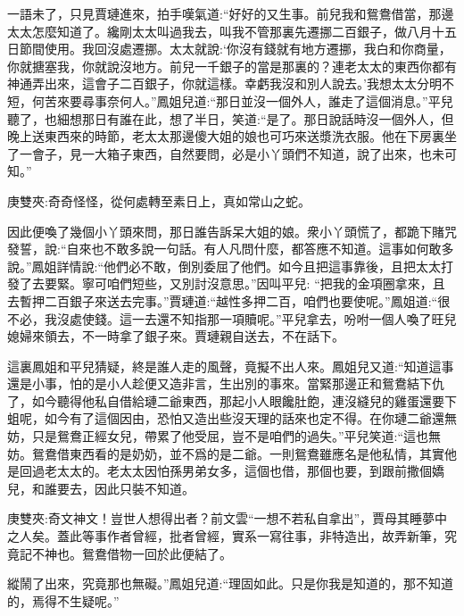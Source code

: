 \begin{parag}
    一語未了，只見賈璉進來，拍手嘆氣道:“好好的又生事。前兒我和鴛鴦借當，那邊太太怎麼知道了。纔剛太太叫過我去，叫我不管那裏先遷挪二百銀子，做八月十五日節間使用。我回沒處遷挪。太太就說:‘你沒有錢就有地方遷挪，我白和你商量，你就搪塞我，你就說沒地方。前兒一千銀子的當是那裏的？連老太太的東西你都有神通弄出來，這會子二百銀子，你就這樣。幸虧我沒和別人說去。’我想太太分明不短，何苦來要尋事奈何人。”鳳姐兒道:“那日並沒一個外人，誰走了這個消息。”平兒聽了，也細想那日有誰在此，想了半日，笑道:“是了。那日說話時沒一個外人，但晚上送東西來的時節，老太太那邊傻大姐的娘也可巧來送漿洗衣服。他在下房裏坐了一會子，見一大箱子東西，自然要問，必是小丫頭們不知道，說了出來，也未可知。”\begin{note}庚雙夾:奇奇怪怪，從何處轉至素日上，真如常山之蛇。\end{note}因此便喚了幾個小丫頭來問，那日誰告訴呆大姐的娘。衆小丫頭慌了，都跪下賭咒發誓，說:“自來也不敢多說一句話。有人凡問什麼，都答應不知道。這事如何敢多說。”鳳姐詳情說:“他們必不敢，倒別委屈了他們。如今且把這事靠後，且把太太打發了去要緊。寧可咱們短些，又別討沒意思。”因叫平兒: “把我的金項圈拿來，且去暫押二百銀子來送去完事。”賈璉道:“越性多押二百，咱們也要使呢。”鳳姐道:“很不必，我沒處使錢。這一去還不知指那一項贖呢。”平兒拿去，吩咐一個人喚了旺兒媳婦來領去，不一時拿了銀子來。賈璉親自送去，不在話下。
\end{parag}


\begin{parag}
    這裏鳳姐和平兒猜疑，終是誰人走的風聲，竟擬不出人來。鳳姐兒又道:“知道這事還是小事，怕的是小人趁便又造非言，生出別的事來。當緊那邊正和鴛鴦結下仇了，如今聽得他私自借給璉二爺東西，那起小人眼饞肚飽，連沒縫兒的雞蛋還要下蛆呢，如今有了這個因由，恐怕又造出些沒天理的話來也定不得。在你璉二爺還無妨，只是鴛鴦正經女兒，帶累了他受屈，豈不是咱們的過失。”平兒笑道:“這也無妨。鴛鴦借東西看的是奶奶，並不爲的是二爺。一則鴛鴦雖應名是他私情，其實他是回過老太太的。老太太因怕孫男弟女多，這個也借，那個也要，到跟前撒個嬌兒，和誰要去，因此只裝不知道。\begin{note}庚雙夾:奇文神文！豈世人想得出者？前文雲“一想不若私自拿出”，賈母其睡夢中之人矣。蓋此等事作者曾經，批者曾經，實系一寫往事，非特造出，故弄新筆，究竟記不神也。鴛鴦借物一回於此便結了。\end{note}縱鬧了出來，究竟那也無礙。”鳳姐兒道:“理固如此。只是你我是知道的，那不知道的，焉得不生疑呢。”
\end{parag}


